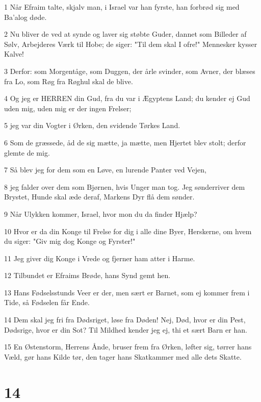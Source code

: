 \par 1 Når Efraim talte, skjalv man, i Israel var han fyrste, han forbrød sig med Ba'alog døde.
\par 2 Nu bliver de ved at synde og laver sig støbte Guder, dannet som Billeder af Sølv, Arbejderes Værk til Hobe; de siger: "Til dem skal I ofre!" Mennesker kysser Kalve!
\par 3 Derfor: som Morgentåge, som Duggen, der årle svinder, som Avner, der blæses fra Lo, som Røg fra Røghul skal de blive.
\par 4 Og jeg er HERREN din Gud, fra du var i Ægyptens Land; du kender ej Gud uden mig, uden mig er der ingen Frelser;
\par 5 jeg var din Vogter i Ørken, den svidende Tørkes Land.
\par 6 Som de græssede, åd de sig mætte, ja mætte, men Hjertet blev stolt; derfor glemte de mig.
\par 7 Så blev jeg for dem som en Løve, en lurende Panter ved Vejen,
\par 8 jeg falder over dem som Bjørnen, hvis Unger man tog. Jeg sønderriver dem Brystet, Hunde skal æde deraf, Markens Dyr flå dem sønder.
\par 9 Når Ulykken kommer, Israel, hvor mon du da finder Hjælp?
\par 10 Hvor er da din Konge til Frelse for dig i alle dine Byer, Herskerne, om hvem du siger: "Giv mig dog Konge og Fyrster!"
\par 11 Jeg giver dig Konge i Vrede og fjerner ham atter i Harme.
\par 12 Tilbundet er Efraims Brøde, hans Synd gemt hen.
\par 13 Hans Fødselsstunds Veer er der, men sært er Barnet, som ej kommer frem i Tide, så Fødselen får Ende.
\par 14 Dem skal jeg fri fra Dødsriget, løse fra Døden! Nej, Død, hvor er din Pest, Dødsrige, hvor er din Sot? Til Mildhed kender jeg ej, thi et sært Barn er han.
\par 15 En Østenstorm, Herrens Ånde, bruser frem fra Ørken, løfter sig, tørrer hans Væld, gør hans Kilde tør, den tager hans Skatkammer med alle dets Skatte.

\chapter{14}

